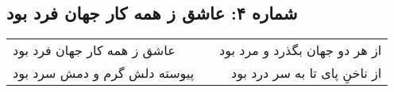 \begin{center}
\section*{شماره ۴: عاشق ز همه کار جهان فرد بود}
\label{sec:004}
\begin{longtable}{l p{0.5cm} r}
عاشق ز همه کار جهان فرد بود
&&
از هر دو جهان بگذرد و مرد بود
\\
پیوسته دلش گرم و دمش سرد بود
&&
از ناخنِ پای تا به سر درد بود
\\
\end{longtable}
\end{center}
